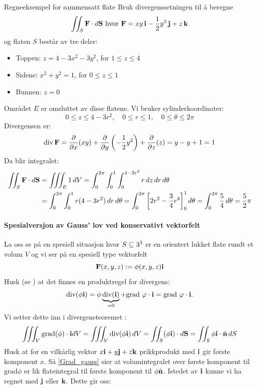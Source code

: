 \begin{eks}{Regneeksempel for sammensatt flate}
Bruk divergenssetningen til å beregne  
\[
\iint_S \mathbf{F} \cdot d\mathbf{S} \text{ hvor } \mathbf{F} = xy\,\mathbf{i} - \frac{1}{2} y^2\,\mathbf{j} + z\,\mathbf{k}
\]  
og flaten \( S \) består av tre deler:
\begin{itemize}
  \item Toppen: \( z = 4 - 3x^2 - 3y^2 \), for \( 1 \leq z \leq 4 \)
  \item Sidene: \( x^2 + y^2 = 1 \), for \( 0 \leq z \leq 1 \)
  \item Bunnen: \( z = 0 \)
\end{itemize}
Området \( E \) er omsluttet av disse flatene. Vi bruker sylinderkoordinater:
\[
0 \leq z \leq 4 - 3r^2,\quad 0 \leq r \leq 1,\quad 0 \leq \theta \leq 2\pi
\]
Divergensen er:
\[
\text{div} \, \mathbf{F} = \frac{\partial}{\partial x}(xy) + \frac{\partial}{\partial y}\left(-\frac{1}{2}y^2\right) + \frac{\partial}{\partial z}(z) = y - y + 1 = 1
\]
Da blir integralet:
\begin{align*}
\iint_S \mathbf{F} \cdot d\mathbf{S} &= \iiint_E 1 \, dV = \int_0^{2\pi} \int_0^1 \int_0^{4 - 3r^2} r \, dz \, dr \, d\theta \\
&= \int_0^{2\pi} \int_0^1 r(4 - 3r^2) \, dr \, d\theta = \int_0^{2\pi} \left[2r^2 - \frac{3}{4}r^4\right]_0^1 d\theta = \int_0^{2\pi} \frac{5}{4} \, d\theta = \frac{5}{2} \pi
\end{align*}
\end{eks}

\paragraph{Spesialversjon av Gauss' lov ved konservativt vektorfelt}
La oss se på en spesiell situasjon hvor $S \subseteq 3^3$ er en orientert lukket flate rundt et volum $V$ og vi ser på en spesiell type vektorfelt 
\[\mathbf{F}(x,y,z):= \phi(x,y,z)\mathbf{i}\]
Husk (se ) at det finnes en produktregel for divergens:
\[\text{div} (\phi \mathbf{i})=\phi \underbrace{\text{div} (\mathbf{i})}_{=0} + \text{grad } \varphi \cdot \mathbf{i} = \text{grad } \varphi \cdot \mathbf{i}.\] 
Vi setter dette inn i  divergensteoremet :
\begin{align}\label{Grad_gauss}
\iiint_V \text{grad} (\phi) \cdot \mathbf{i} dV = \iiint_V  \text{div} (\phi\mathbf{i})\,dV= \iint_S (\phi \mathbf{i}) \cdot d\mathbf{S} = \iint_S \phi \mathbf{i} \cdot \hat{\mathbf{n}}\, dS 
\end{align}
Husk at for en vilkårlig vektor $x\mathbf{i}+y\mathbf{j}+z\mathbf{k}$ prikkprodukt med $\mathbf{i}$ gir første komponent $x$. 
Så \eqref{Grad_gauss} sier at volumintegralet over første komponent til $\text{grad} \phi$ er lik flateintegral til første komponent til $\phi \hat{\mathbf{n}}$. 
Istedet av $\mathbf{i}$ kunne vi ha regnet med $\mathbf{j}$ eller $ \mathbf{k}$. 
Dette gir oss:

